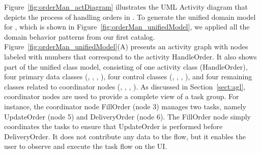 Figure~\ref{fig:orderMan_actDiagram} illustrates the UML Activity diagram that depicts the process of handling orders in \orderman. To generate the unified domain model for \orderman, which is shown in Figure~\ref{fig:orderMan_unifiedModel}, we applied all the domain behavior patterns from our first catalog. Figure~\ref{fig:orderMan_unifiedModel}(A) presents an activity graph with nodes labeled with numbers that correspond to the activity HandleOrder. It also shows part of the unified class model, consisting of one activity class (HandleOrder), four primary data classes (, , , ), four control classes (, , , ), and four remaining classes related to coordinator nodes (, , , ). As discussed in Section~\ref{sect:agl}, coordinator nodes are used to provide a complete view of a task group. For instance, the coordinator node FillOrder (node 3) manages two tasks, namely UpdateOrder (node 5) and DeliveryOrder (node 6). The FillOrder node simply coordinates the tasks to ensure that UpdateOrder is performed before DeliveryOrder. It does not contribute any data to the flow, but it enables the user to observe and execute the task flow on the UI.

